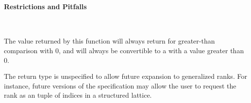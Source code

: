 \paragraph{Restrictions and Pitfalls}\mbox{} \\
\begin{compactitem}
  \item The value returned by this function will always return 
  for greater-than comparison with 0, and will always be convertible to a
     with a value greater than 0.
  \item The return type is unspecified to allow future expansion to generalized
    \glspl{rank}.  For instance, future versions of the specification may allow the user to
    request the \gls{rank} as an  \gls{tuple} of indices in a structured
  lattice.
\end{compactitem}

